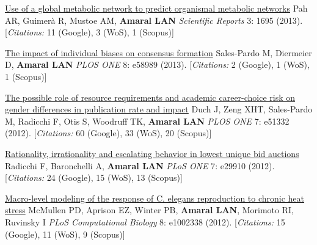 \NumberedItem{\makebox[0.8cm][r]{[100]}}
\href{/people/amaral/use-global-metabolic-network-predict-organismal-metabolic-networks}
{Use of a global metabolic network to predict organismal metabolic networks}
\newline
Pah AR, Guimer\`a R, Mustoe AM, {\textbf{Amaral LAN}}
\newline
\textit{Scientific Reports}
    3:
1695 (2013).
    [{\em{Citations:}} 11 (Google), 3 (WoS), 1 (Scopus)]
\newline
\Gap
~
\Gap

\NumberedItem{\makebox[0.8cm][r]{[99]}}
\href{/people/amaral/impact-individual-biases-consensus-formation}
{The impact of individual biases on consensus formation}
\newline
Sales-Pardo M, Diermeier D, {\textbf{Amaral LAN}}
\newline
\textit{PLOS ONE}
    8:
e58989 (2013).
    [{\em{Citations:}} 2 (Google), 1 (WoS), 1 (Scopus)]
\newline
\Gap
~
\Gap

\NumberedItem{\makebox[0.8cm][r]{[98]}}
\href{/people/amaral/possible-role-resource-requirements-and-academic-career-choice-risk-gender-differences-publication-rate-and-impact}
{The possible role of resource requirements and academic career-choice risk on gender differences in publication rate and impact}
\newline
Duch J, Zeng XHT, Sales-Pardo M, Radicchi F, Otis S, Woodruff TK, {\textbf{Amaral LAN}}
\newline
\textit{PLOS ONE}
    7:
e51332 (2012).
    [{\em{Citations:}} 60 (Google), 33 (WoS), 20 (Scopus)]
\newline
\Gap
~
\Gap

\NumberedItem{\makebox[0.8cm][r]{[97]}}
\href{/people/amaral/rationality-irrationality-and-escalating-behavior-lowest-unique-bid-auctions}
{Rationality, irrationality and escalating behavior in lowest unique bid auctions}
\newline
Radicchi F, Baronchelli A, {\textbf{Amaral LAN}}
\newline
\textit{PLoS ONE}
    7:
e29910 (2012).
    [{\em{Citations:}} 24 (Google), 15 (WoS), 13 (Scopus)]
\newline
\Gap
~
\Gap

\NumberedItem{\makebox[0.8cm][r]{[96]}}
\href{/people/amaral/macro-level-modeling-response-_c-elegans_-reproduction-chronic-heat-stress}
{Macro-level modeling of the response of C. elegans reproduction to chronic heat stress}
\newline
McMullen PD, Aprison EZ, Winter PB, {\textbf{Amaral LAN}}, Morimoto RI, Ruvinsky I
\newline
\textit{PLoS Computational Biology}
    8:
e1002338 (2012).
    [{\em{Citations:}} 15 (Google), 11 (WoS), 9 (Scopus)]
\newline
\Gap
~
\Gap

